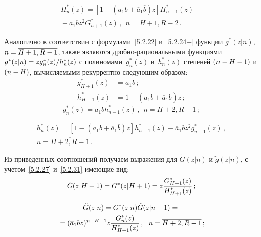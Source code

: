 \begin{multicols}{2}
\noindent
\begin{multline*}
H_n^*(z) = \left[1 - (a_1 b + \overline{a}_1 \overline{b}) z\right] H_{n+1}^*(z) -{}\\
{}- a_1 \overline{b} z^2 G_{n+1}^*(z) \,,\ \
n=\overline{H+1,R-2}\,.
\end{multline*}


Аналогично в соответствии с
формулами~\eqref{5.2.22} и~\eqref{5.2.24+}
функции $g^*(z|n)$, ${n\hm=\overline{H+1,R-1}}$, также
являются дроб\-но-ра\-ци\-о\-наль\-ны\-ми
функциями ${g^*(z|n)\hm=z g_n^*(z)/h_n^*(z)}$ с
полиномами~$g_n^*(z)$ и~$h_n^*(z)$ степеней
$(n\hm-H\hm-1)$ и $(n\hm-H)$, вычисляемыми рекуррентно следующим образом:
\begin{align*}
g_{H+1}^*(z) &= a_1 \overline{b} \,;
\\
h_{H+1}^*(z) &= 1 - (a_1 b + \overline{a}_1 \overline{b}) z \,;
\end{align*}
\begin{equation}
\label{5.2.31}
g_n^*(z) = a_1 \overline{b} h_{n-1}^*(z) \,,\ \ n=\overline{H+2,R-1}\,;
\end{equation}

\vspace*{-12pt}

\noindent
\begin{multline*}
h_n^*(z) = \left[1 - (a_1 b + \overline{a}_1 \overline{b}) z\right] h_{n+1}^*(z)
- \overline{a}_1 b z^2 g_{n-1}^*(z) \,,\\
n=\overline{H+2,R-1}\,.
\end{multline*}

Из приведенных соотношений получаем выражения для
$\tilde{G}(z|n)$ и $\tilde{g}(z|n)$, с учетом~\eqref{5.2.27}
и~\eqref{5.2.31} имеющие вид:
\begin{equation*}
\tilde{G}(z|H+1) = G^*(z|H+1) = z \displaystyle\frac{\displaystyle G^*_{H+1}(z)\mathstrut}{\displaystyle H^*_{H+1}(z)\mathstrut}\,;
\end{equation*}

\vspace*{-12pt}

\noindent
\begin{multline*}
\tilde{G}(z|n) = G^*(z|n) \tilde{G}(z|n-1) ={}\\
{}=
(\overline{a}_1 b z)^{n-H-1} z \displaystyle\frac{\displaystyle G^*_n(z)\mathstrut}{\displaystyle H^*_{H+1}(z)\mathstrut}\,,\ \ n=\overline{H+2,R-1}\,;
\end{multline*}

\vspace*{-6pt}


\end{multicols}

